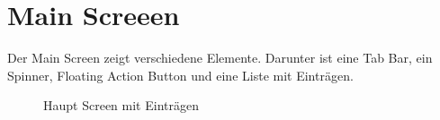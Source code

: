 \documentclass[
    DIV12,
    cleardouble=plain,
    headings=normal,
    pdftex,
    headexclude,footexclude,
    final
]{scrreprt}
\begin{document}
\newpage

\section{Main Screeen}
Der Main Screen zeigt verschiedene Elemente. Darunter ist eine Tab Bar, ein Spinner, Floating Action Button und eine Liste mit Einträgen.
\begin{figure}[H]
	\centering
	\caption{Haupt Screen mit Einträgen}
	\label{mainscreen}
\end{figure}
\newpage
\end{document}
